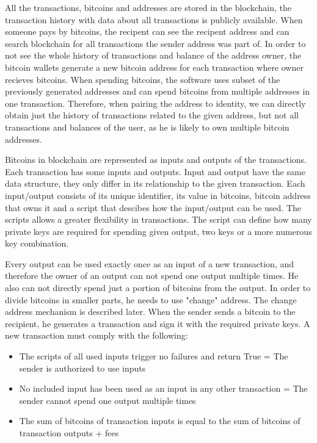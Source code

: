 \documentclass[
  digital, %
  table,   %
  lof,     %
  lot,     %
  oneside
]{fithesis3}
\begin{document}
All the transactions, bitcoins and addresses are stored in the blockchain,
the transaction history with data about all transactions is publicly available.
When someone pays by bitcoins, the recipent can see the recipent address
and can search blockchain for all transactions the sender address was part of.
In order to not see the whole history of transactions and balance of the address owner,
the bitcoin wallets generate a new bitcoin address for each transaction where
owner recieves bitcoins.
When spending bitcoins, the software uses subset of the previously generated addresses and
can spend bitcoins from multiple addresses in one transaction.
Therefore, when pairing the address to identity,
we can directly obtain just the history of transactions related to the given
address, but not all transactions and balances of the user,
as he is likely to own multiple bitcoin addresses.

Bitcoins in blockchain are represented as inputs and outputs of the transactions.
Each transaction has some inputs and outputs. 
Input and output have the same data structure,
they only differ in its relationship to the given transaction.
Each input/output consists of its unique identifier, its value in bitcoins,
bitcoin address that owns it and a script that descibes how the input/output can be used.
The scripts allows a greater flexibility in transactions. The script can define how many private keys
are required for spending given output, two keys or a more numerous key combination.

Every output can be used exactly once as an input of a new transaction,
and therefore the owner of an output can not
spend one output multiple times. He also can not directly
spend just a portion of bitcoins from the output. In order to divide bitcoins in smaller parts,
he needs to use "change" address. The change address mechanism is described later.
When the sender sends a bitcoin to the recipient, he generates a transaction
and sign it with the required private keys.
A new transaction must comply with the following:

\begin{itemize}
  \item The scripts of all used inputs trigger no failures and return True = The sender is authorized to use inputs
  \item No included input has been used as an input in any other transaction = The sender cannot spend one output multiple times
  \item The sum of bitcoins of transaction inputs is equal to the sum of bitcoins of transaction outputs + fees
\end{itemize}
\end{document}
